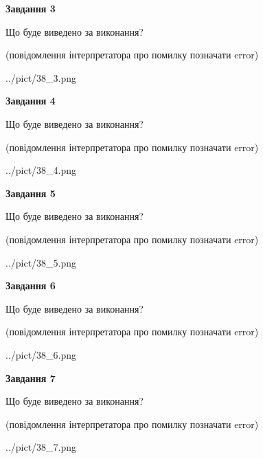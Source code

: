 \documentclass[12pt, ukrainian]{article}
\begin{document}
{\begin {large}
{\begin {center}\textbf{Завдання 3}\end {center}}\par
Що буде виведено за виконання?\par
 (повідомлення інтерпретатора про помилку позначати error)\par
\begin{center}
	{../pict/38_3.png}
\end{center}
\newpage

{\begin {center}\textbf{Завдання 4}\end {center}}\par
Що буде виведено за виконання?\par
 (повідомлення інтерпретатора про помилку позначати error)\par
\begin{center}
	{../pict/38_4.png}
\end{center}
\newpage

{\begin {center}\textbf{Завдання 5}\end {center}}\par
Що буде виведено за виконання?\par
 (повідомлення інтерпретатора про помилку позначати error)\par
\begin{center}
	{../pict/38_5.png}
\end{center}
\newpage

{\begin {center}\textbf{Завдання 6}\end {center}}\par
Що буде виведено за виконання?\par
 (повідомлення інтерпретатора про помилку позначати error)\par
\begin{center}
	{../pict/38_6.png}
\end{center}
\newpage

{\begin {center}\textbf{Завдання 7}\end {center}}\par
Що буде виведено за виконання?\par
 (повідомлення інтерпретатора про помилку позначати error)\par
\begin{center}
	{../pict/38_7.png}
\end{center}
\newpage


\end{large}}
\end{document}

